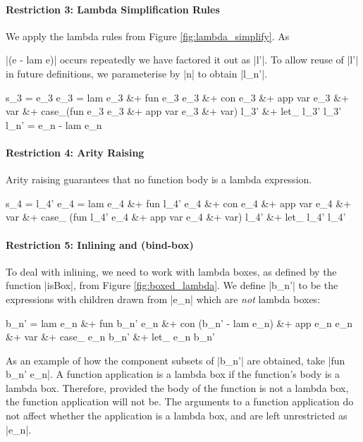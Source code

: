 \documentclass[preprint]{sigplanconf}
\begin{document}
\paragraph{Restriction 3: Lambda Simplification Rules}
We apply the lambda rules from Figure \ref{fig:lambda_simplify}. As \ignore|(e - lam e)| occurs repeatedly we have factored it out as |l'|. To allow reuse of |l'| in future definitions, we parameterise by |n| to obtain |l_n'|.

\ignore\begin{code}
s_3   =  e_3
e_3   =  lam e_3 &+ fun e_3 e_3 &+ con e_3 &+ app var e_3 &+ var &+
         case_(fun e_3 e_3 &+ app var e_3 &+ var) l_3' &+ let_ l_3' l_3'
l_n'  =  e_n - lam e_n
\end{code}

\paragraph{Restriction 4: Arity Raising}
Arity raising guarantees that no function body is a lambda expression.


\ignore\begin{code}
s_4   =  l_4'
e_4   =  lam e_4 &+ fun l_4' e_4 &+ con e_4 &+ app var e_4 &+ var &+
         case_ (fun l_4' e_4 &+ app var e_4 &+ var) l_4' &+ let_ l_4' l_4'
\end{code}

\paragraph{Restriction 5: Inlining and (bind-box)}
To deal with inlining, we need to work with lambda boxes, as defined by the function |isBox|, from Figure \ref{fig:boxed_lambda}. We define |b_n'| to be the expressions with children drawn from |e_n| which are \textit{not} lambda boxes:

\ignore\begin{code}
b_n'  =  lam e_n &+ fun b_n' e_n &+ con (b_n' - lam e_n) &+ app e_n e_n &+ var &+
         case_ e_n b_n' &+ let_ e_n b_n'
\end{code}

As an example of how the component subsets of |b_n'| are obtained, take |fun b_n' e_n|. A function application is a lambda box if the function's body is a lambda box. Therefore, provided the body of the function is not a lambda box, the function application will not be. The arguments to a function application do not affect whether the application is a lambda box, and are left unrestricted as |e_n|.
\end{document}
